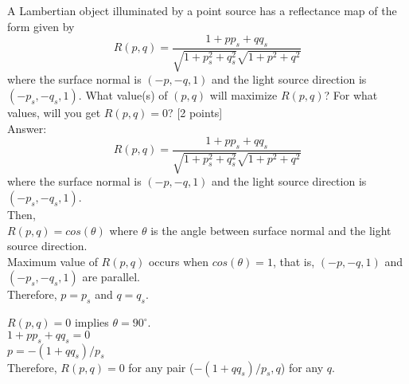 \documentclass[11pt]{article}
\begin{document}
\maketitle

A Lambertian object illuminated by a point source has a reflectance map of the form given by 
\begin{equation}
R(p,q) = \frac{1+pp_s + qq_s}{\sqrt{1+p^2_s+q^2_s}\sqrt{1+p^2+q^2}}
\end{equation}
where the surface normal is $(-p,-q,1)$ and the light source direction is $(-p_s,-q_s,1)$. What value(s) of $(p,q)$ will maximize $R(p,q)$? For what values, will you get $R(p,q) = 0$? \textsf{[2 points]}\\

Answer: \\
\begin{equation}
R(p,q) = \frac{1+pp_s + qq_s}{\sqrt{1+p^2_s+q^2_s}\sqrt{1+p^2+q^2}}
\end{equation}
where the surface normal is $(-p,-q,1)$ and the light source direction is $(-p_s,-q_s,1)$. \\

Then, \\
$ R(p,q) = cos (\theta) $ where $\theta$ is the angle between surface normal and the light source direction. \\
Maximum value of $ R(p,q)$ occurs when $ cos (\theta) = 1$, that is, $(-p,-q,1)$ and $(-p_s,-q_s,1)$ are parallel. \\
Therefore, $ p = p_{s} $ and $ q = q_{s}$.

$ R(p,q) = 0 $ implies $\theta = 90^{\circ}$. \\
$ 1 + pp_s + qq_s = 0$ \\
$ p = - (1 + qq_s)/p_s$ \\
Therefore, $ R(p,q) = 0 $ for any pair ($- (1 + qq_s)/p_s, q$) for any $q$. \\
\end{document}
